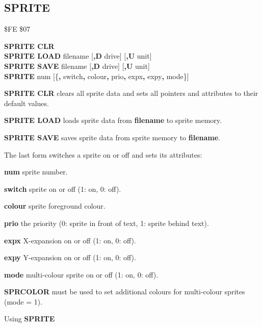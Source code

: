 \subsection{SPRITE}
\begin{description}[leftmargin=2cm,style=nextline]
\item [Token:]    \$FE \$07

\item [Format:]   {\bf SPRITE CLR} \\
                  {\bf SPRITE LOAD} filename [{\bf,D} drive] [{\bf,U} unit] \\
                  {\bf SPRITE SAVE} filename [{\bf,D} drive] [{\bf,U} unit] \\
                  {\bf SPRITE} num [\{{\bf,} switch{\bf,} colour{\bf,} prio{\bf,} expx{\bf,} expy{\bf,} mode\}]

\item [Usage:]    {\bf SPRITE CLR} clears all sprite data and sets all pointers and attributes to their default values.

                  {\bf SPRITE LOAD } loads sprite data from {\bf filename} to sprite memory.

                  {\bf SPRITE SAVE } saves sprite data from sprite memory to {\bf filename}.

                  \filenamedefinition

                  The last form switches a sprite on or off and sets its attributes:

                  {\bf num} sprite number.

                  {\bf switch} sprite on or off (1: on, 0: off).

                  {\bf colour} sprite foreground colour.

                  {\bf prio} the priority (0: sprite in front of text, 1: sprite behind text).

                  {\bf expx} X-expansion on or off (1: on, 0: off).

                  {\bf expy} Y-expansion on or off (1: on, 0: off).

                  {\bf mode} multi-colour sprite on or off (1: on, 0: off).

\item [Remarks:]  {\bf SPRCOLOR} must be used to set additional colours for multi-colour sprites (mode = 1).

\item [Example:]  Using {\bf SPRITE}


\end{description}
